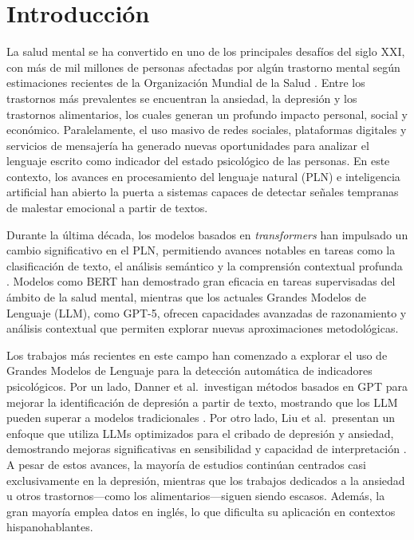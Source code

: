 \documentclass[11pt,a4paper,oneside]{article}
\begin{document}
\section{Introducción}
\label{sec:introduccion}

La salud mental se ha convertido en uno de los principales desafíos del siglo XXI, con más de mil millones de personas afectadas por algún trastorno mental según estimaciones recientes de la Organización Mundial de la Salud \cite{BillionPeopleLiving}. Entre los trastornos más prevalentes se encuentran la ansiedad, la depresión y los trastornos alimentarios, los cuales generan un profundo impacto personal, social y económico. Paralelamente, el uso masivo de redes sociales, plataformas digitales y servicios de mensajería ha generado nuevas oportunidades para analizar el lenguaje escrito como indicador del estado psicológico de las personas. En este contexto, los avances en procesamiento del lenguaje natural (PLN) e inteligencia artificial han abierto la puerta a sistemas capaces de detectar señales tempranas de malestar emocional a partir de textos.

Durante la última década, los modelos basados en \textit{transformers} han impulsado un cambio significativo en el PLN, permitiendo avances notables en tareas como la clasificación de texto, el análisis semántico y la comprensión contextual profunda \cite{vaswaniAttentionAllYou2017}. Modelos como BERT \cite{devlinBERTPretrainingDeep2019} han demostrado gran eficacia en tareas supervisadas del ámbito de la salud mental, mientras que los actuales Grandes Modelos de Lenguaje (LLM), como GPT-5, ofrecen capacidades avanzadas de razonamiento y análisis contextual que permiten explorar nuevas aproximaciones metodológicas.

Los trabajos más recientes en este campo han comenzado a explorar el uso de Grandes Modelos de Lenguaje para la detección automática de indicadores psicológicos. Por un lado, Danner et al.\ investigan métodos basados en GPT para mejorar la identificación de depresión a partir de texto, mostrando que los LLM pueden superar a modelos tradicionales \cite{dannerAdvancingMentalHealth2023}. Por otro lado, Liu et al.\ presentan un enfoque que utiliza LLMs optimizados para el cribado de depresión y ansiedad, demostrando mejoras significativas en sensibilidad y capacidad de interpretación \cite{liuEnhancedLargeLanguage2025}. A pesar de estos avances, la mayoría de estudios continúan centrados casi exclusivamente en la depresión, mientras que los trabajos dedicados a la ansiedad u otros trastornos---como los alimentarios---siguen siendo escasos. Además, la gran mayoría emplea datos en inglés, lo que dificulta su aplicación en contextos hispanohablantes.
\end{document}
